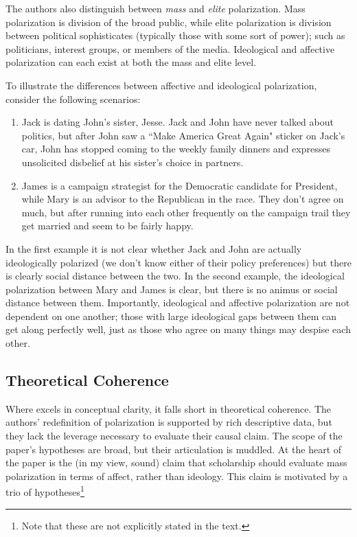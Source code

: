 \documentclass[12pt]{article}
\begin{document}
The authors also distinguish between \textit{mass} and \textit{elite} polarization. Mass polarization is division of the broad public, while elite polarization is division between political sophisticates (typically those with some sort of power); such as politicians, interest groups, or members of the media. Ideological and affective polarization can each exist at both the mass and elite level.

To illustrate the differences between affective and ideological polarization, consider the following scenarios:
\begin{enumerate}
\item Jack is dating John's sister, Jesse. Jack and John have never talked about politics, but after John saw a ``Make America Great Again" sticker on Jack's car, John has stopped coming to the weekly family dinners and expresses unsolicited disbelief at his sister's choice in partners.

\item James is a campaign strategist for the Democratic candidate for President, while Mary is an advisor to the Republican in the race. They don't agree on much, but after running into each other frequently on the campaign trail they get married and seem to be fairly happy. 

\end{enumerate}

\noindent In the first example it is not clear whether Jack and John are actually ideologically polarized (we don't know either of their policy preferences) but there is clearly social distance between the two. In the second example, the ideological polarization between Mary and James is clear, but there is no animus or social distance between them. Importantly, ideological and affective polarization are not dependent on one another; those with large ideological gaps between them can get along perfectly well, just as those who agree on many things may despise each other.

\subsection{Theoretical Coherence}
Where \citet{iyengar2012affect} excels in conceptual clarity, it falls short in theoretical coherence. The authors' redefinition of polarization is supported by rich descriptive data, but they lack the leverage necessary to evaluate their causal claim. The scope of the paper's hypotheses are broad, but their articulation is muddled. At the heart of the paper is the (in my view, sound) claim that scholarship should evaluate mass polarization in terms of affect, rather than ideology. This claim is motivated by a trio of hypotheses\footnote{Note that these are not explicitly stated in the text.}
\end{document}
